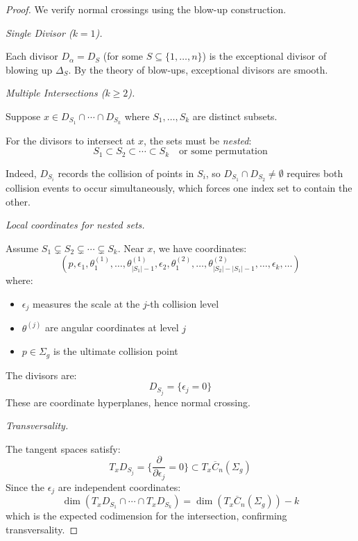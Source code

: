 \begin{proof}
We verify normal crossings using the blow-up construction.

\medskip
\noindent\emph{Single Divisor ($k=1$).}

Each divisor $D_\alpha = D_S$ (for some $S \subseteq \{1,\ldots,n\}$) is the exceptional divisor of blowing up $\Delta_S$. By the theory of blow-ups, exceptional divisors are smooth.

\medskip
\noindent\emph{Multiple Intersections ($k \geq 2$).}

Suppose $x \in D_{S_1} \cap \cdots \cap D_{S_k}$ where $S_1, \ldots, S_k$ are distinct subsets. 

For the divisors to intersect at $x$, the sets must be \emph{nested}:
\[S_1 \subset S_2 \subset \cdots \subset S_k \quad \text{or some permutation}\]

Indeed, $D_{S_i}$ records the collision of points in $S_i$, so $D_{S_1} \cap D_{S_2} \neq \emptyset$ requires both collision events to occur simultaneously, which forces one index set to contain the other.

\emph{Local coordinates for nested sets.}

Assume $S_1 \subsetneq S_2 \subsetneq \cdots \subsetneq S_k$. Near $x$, we have coordinates:
\[(p, \epsilon_1, \theta_1^{(1)}, \ldots, \theta_{|S_1|-1}^{(1)}, \epsilon_2, \theta_1^{(2)}, \ldots, \theta_{|S_2|-|S_1|-1}^{(2)}, \ldots, \epsilon_k, \ldots)\]
where:
\begin{itemize}
\item $\epsilon_j$ measures the scale at the $j$-th collision level
\item $\theta^{(j)}$ are angular coordinates at level $j$
\item $p \in \Sigma_g$ is the ultimate collision point
\end{itemize}

The divisors are:
\[D_{S_j} = \{\epsilon_j = 0\}\]
These are coordinate hyperplanes, hence normal crossing.

\medskip
\noindent\emph{Transversality.}

The tangent spaces satisfy:
\[T_x D_{S_j} = \{\frac{\partial}{\partial \epsilon_j} = 0\} \subset T_x \overline{C}_n(\Sigma_g)\]
Since the $\epsilon_j$ are independent coordinates:
\[\dim(T_x D_{S_1} \cap \cdots \cap T_x D_{S_k}) = \dim(T_x \overline{C}_n(\Sigma_g)) - k\]
which is the expected codimension for the intersection, confirming transversality.
\end{proof}

